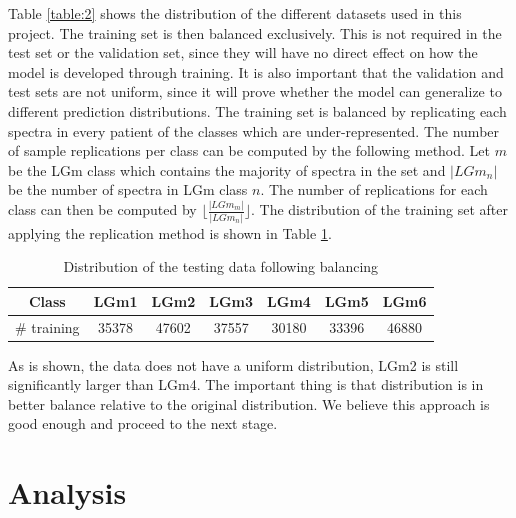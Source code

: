 Table \ref{table:2} shows the distribution of the different datasets used in this project. The training set is then balanced exclusively. This is not required in the test set or the validation set, since they will have no direct effect on how the model is developed through training. It is also important that the validation and test sets are not uniform, since it will prove whether the model can generalize to different prediction distributions. The training set is balanced by replicating each spectra in every patient of the classes which are under-represented. The number of sample replications per class can be computed by the following method. Let $m$ be the LGm class which contains the majority of spectra in the set and $|LGm_n|$ be the number of spectra in LGm class $n$. The number of replications for each class can then be computed by $\lfloor \frac{|LGm_m|}{|LGm_n|} \rfloor$. The distribution of the training set after applying the replication method is shown in Table \ref{table:3}.

\begin{table}[htb]
\centering
 \begin{tabular}{||c c c c c c c||} 
 \hline
 Class & LGm1 & LGm2 & LGm3 & LGm4 & LGm5 & LGm6 \\ [0.5ex] 
 \hline\hline
 \# training & 35378 & 47602 & 37557 & 30180 & 33396 & 46880 \\
 \hline 

\end{tabular}
\caption{Distribution of the testing data following balancing}
\label{table:3}
\end{table}

As is shown, the data does not have a uniform distribution, LGm2 is still significantly larger than LGm4. The important thing is that distribution is in better balance relative to the original distribution. We believe this approach is good enough and proceed to the next stage.


\section{Analysis}

